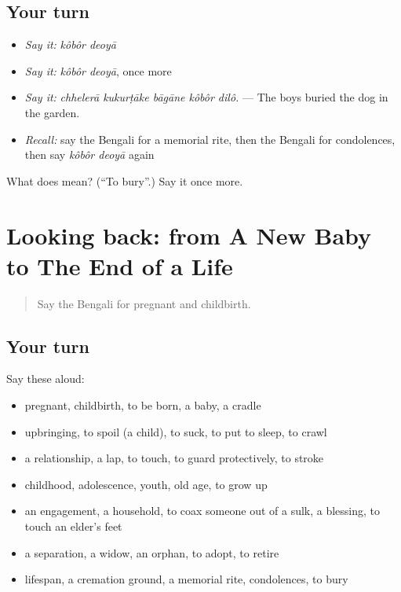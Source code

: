 \subsection*{Your turn}
\begin{itemize}
\raggedright
  \item \emph{Say it:} \emph{kôbôr deoyā}
  \item \emph{Say it:} \emph{kôbôr deoyā}, once more
  \item \emph{Say it:} \emph{chhelerā kukurṭāke bāgāne kôbôr dilô.} — The boys buried the dog in the garden.
  \item \emph{Recall:} say the Bengali for a memorial rite, then the Bengali for condolences, then say \emph{kôbôr deoyā} again
\end{itemize}

\begin{tcolorbox}[breakable,colback=teal!4,colframe=teal!35!black,title={Before you move on}]
What does   mean? (\textquotedblleft{}To bury\textquotedblright{}.) Say it once more.
\end{tcolorbox}
\section[(dialogue)]{Looking back: from A New Baby to The End of a Life}

\label{lesson:BN-R491-review-485-491}



\begin{quote}
Say the Bengali for pregnant and childbirth.
\end{quote}

\subsection*{Your turn}
Say these aloud:

\begin{itemize}
\raggedright
  \item pregnant, childbirth, to be born, a baby, a cradle
  \item upbringing, to spoil (a child), to suck, to put to sleep, to crawl
  \item a relationship, a lap, to touch, to guard protectively, to stroke
  \item childhood, adolescence, youth, old age, to grow up
  \item an engagement, a household, to coax someone out of a sulk, a blessing, to touch an elder's feet
  \item a separation, a widow, an orphan, to adopt, to retire
  \item lifespan, a cremation ground, a memorial rite, condolences, to bury
\end{itemize}

